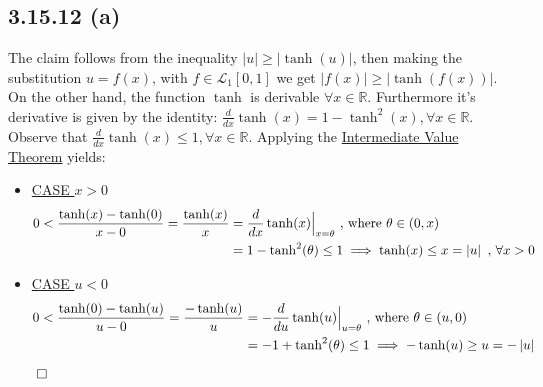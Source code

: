 \documentclass{exam}
\renewenvironment{proof}{{\noindent\itshape\ignorespaces}}{{\hfill$\qed$\\}}
\begin{document}
\subsection*{3.15.12 (a)}
The claim follows from the inequality $\left| u \right|  \geq \left|\tanh(u) \right|$,  then making the substitution $u = f(x)$, with $f \in \mathcal{L}_1[0,1]$ we get $\left| f(x) \right|  \geq \left|\tanh(f(x)) \right|$. On the other hand, the function $\tanh$ is derivable $\forall x \in \mathbb{R}$. Furthermore it's derivative is 
given by the identity: $\displaystyle \frac{d}{dx} \tanh(x) = 1 - \tanh^{2}(x), \forall x \in \mathbb{R}$. Observe that $\displaystyle \frac{d}{dx} \tanh(x) \leq 1, \forall x \in \mathbb{R}$. Applying the \href{https://en.wikipedia.org/wiki/Intermediate_value_theorem}{Intermediate Value Theorem} yields:\\
\begin{proof}
    \begin{itemize}
        \item  \underline{CASE $x>0$}\\
                \begin{equation*}
                    \begin{aligned}
                        0 < \displaystyle \frac{\tanh(x) - \tanh(0)}{x - 0} = \displaystyle \frac{\tanh(x)}{x}  &=  \displaystyle \frac{d}{dx} \tanh(x) {\Big|}_{\tiny x=\theta} \text{ , where $\theta \in (0,x)$}\\
                            &= 1 - \tanh^{2}(\theta) \leq 1 \implies \tanh(x) \leq x = \left| u\right| \ \text{,} \ \forall x > 0
                    \end{aligned}    
                \end{equation*}
                
        \item  \underline{CASE $u<0$}\\
                \begin{equation*}
                    \begin{aligned}
                        0 < \displaystyle \frac{\tanh(0) - \tanh(u)}{u - 0} = \displaystyle \frac{-\tanh(u)}{u}  &=  \displaystyle -\frac{d}{du} \tanh(u) {\Big|}_{\tiny u=\theta} \text{ , where $\theta \in (u,0)$}\\
                            &=  -1 + \tanh^{2}(\theta) \leq 1 \implies -\tanh(u) \geq u = - \left| u\right|
                    \end{aligned}    
                \end{equation*}            
    \end{itemize}
\end{proof}
\end{document}
